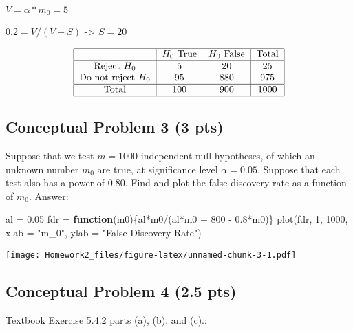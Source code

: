 \documentclass[
]{article}
\newenvironment{Shaded}{\begin{snugshade}}{\end{snugshade}}
\newcommand{\AttributeTok}[1]{\textcolor[rgb]{0.77,0.63,0.00}{#1}}
\newcommand{\ControlFlowTok}[1]{\textcolor[rgb]{0.13,0.29,0.53}{\textbf{#1}}}
\newcommand{\DecValTok}[1]{\textcolor[rgb]{0.00,0.00,0.81}{#1}}
\newcommand{\FloatTok}[1]{\textcolor[rgb]{0.00,0.00,0.81}{#1}}
\newcommand{\FunctionTok}[1]{\textcolor[rgb]{0.00,0.00,0.00}{#1}}
\newcommand{\NormalTok}[1]{#1}
\newcommand{\OtherTok}[1]{\textcolor[rgb]{0.56,0.35,0.01}{#1}}
\newcommand{\SpecialCharTok}[1]{\textcolor[rgb]{0.00,0.00,0.00}{#1}}
\newcommand{\StringTok}[1]{\textcolor[rgb]{0.31,0.60,0.02}{#1}}
\begin{document}
\(V = \alpha*m_0 = 5\)

\(0.2 = V/(V + S)\) -\textgreater{} \(S = 20\)

\[
\begin{tabular}{|c|c c|c|}  \hline
 & $H_0$ True & $H_0$ False & Total \\
\hline 
Reject $H_0$ & 5 & 20 & 25 \\ 
Do not reject $H_0$ & 95 & 880 & 975 \\ 
 \hline
Total & 100 & 900 & 1000 \\ 
\hline  
\end{tabular}
\]

\hypertarget{conceptual-problem-3-3-pts}{%
\subsection{Conceptual Problem 3 (3
pts)}\label{conceptual-problem-3-3-pts}}

Suppose that we test \(m = 1000\) independent null hypotheses, of which
an unknown number \(m_0\) are true, at significance level
\(\alpha = 0.05\). Suppose that each test also has a power of 0.80. Find
and plot the false discovery rate as a function of \(m_0\). Answer:

\begin{Shaded}
\begin{Highlighting}[]
\NormalTok{al }\OtherTok{=} \FloatTok{0.05}
\NormalTok{fdr }\OtherTok{=} \ControlFlowTok{function}\NormalTok{(m0)\{al}\SpecialCharTok{*}\NormalTok{m0}\SpecialCharTok{/}\NormalTok{(al}\SpecialCharTok{*}\NormalTok{m0 }\SpecialCharTok{+} \DecValTok{800} \SpecialCharTok{{-}} \FloatTok{0.8}\SpecialCharTok{*}\NormalTok{m0)\}}
\FunctionTok{plot}\NormalTok{(fdr, }\DecValTok{1}\NormalTok{, }\DecValTok{1000}\NormalTok{, }\AttributeTok{xlab =} \StringTok{"m\_0"}\NormalTok{, }\AttributeTok{ylab =} \StringTok{"False Discovery Rate"}\NormalTok{)}
\end{Highlighting}
\end{Shaded}

\texttt{[image: Homework2\_files/figure-latex/unnamed-chunk-3-1.pdf]}

\hypertarget{conceptual-problem-4-2.5-pts}{%
\subsection{Conceptual Problem 4 (2.5
pts)}\label{conceptual-problem-4-2.5-pts}}

Textbook Exercise 5.4.2 parts (a), (b), and (c).:
\end{document}
